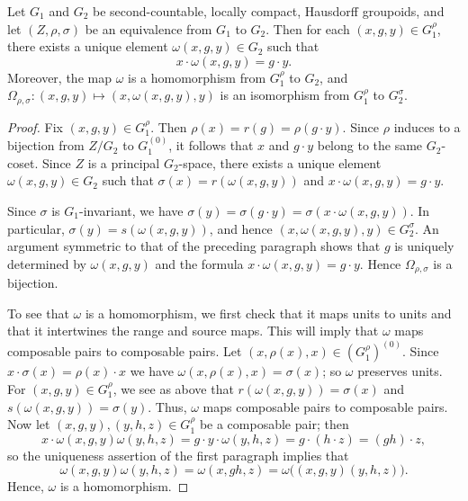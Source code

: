 \documentclass[12pt,a4paper]{amsart}
\newcommand{\id}{\operatorname{id}}
\newcommand{\unit}[1]{#1}%
\begin{document}
\begin{lemma}\label{lem:pullback groupoids equiv}
Let $G_1$ and $G_2$ be second-countable, locally compact,
Hausdorff groupoids, and let $(Z,\rho,\sigma)$ be an
equivalence from $G_1$ to $G_2$. Then for each $(x,g,y) \in
G_1^\rho$, there exists a unique element $\omega(x,g,y) \in
G_2$ such that
\begin{equation*}\label{eq:theta def}
x \cdot \omega(x,g,y) = g \cdot y.
\end{equation*}
Moreover, the map $\omega$ is a homomorphism from $G_1^\rho$ to
$G_2$, and $\Omega_{\rho,\sigma} : (x,g,y) \mapsto (x,
\omega(x,g,y), y)$ is an isomorphism from $G_1^\rho$ to
$G_2^\sigma$.
\end{lemma}
\begin{proof}
Fix $(x,g,y) \in G_1^\rho$. Then $\rho(x) = r(g) = \rho(g\cdot
y)$. Since $\rho$ induces to a bijection from $Z/G_2$ to
$G_1^{(0)}$, it follows that $x$ and $g\cdot y$ belong to the
same $G_2$-coset. Since $Z$ is a principal $G_2$-space, there
exists a unique element $\omega(x,g,y) \in G_2$ such that
$\sigma(x) = r(\omega(x,g,y))$ and $x \cdot \omega(x,g,y) = g
\cdot y$.

Since $\sigma$ is $G_1$-invariant, we have $\sigma(y) =
\sigma(g \cdot y) = \sigma(x \cdot \omega(x,g,y))$. In
particular, $\sigma(y) = s(\omega(x,g,y))$, and hence $(x,
\omega(x,g,y), y) \in G_2^\sigma$. An argument symmetric to
that of the preceding paragraph shows that $g$ is uniquely
determined by $\omega(x,g,y)$ and the formula $x \cdot
\omega(x,g,y) = g \cdot y$. Hence $\Omega_{\rho,\sigma}$ is a
bijection.

To see that $\omega$ is a homomorphism, we first check that it
maps units to units and that it intertwines the range and source
maps. This will imply that $\omega$ maps composable pairs to
composable pairs.  Let $(x, \rho(x), x) \in (G_1^\rho)^{(0)}$.
Since $x \cdot \sigma(x) = \rho(x) \cdot x$ we have $\omega(x,
\rho(x), x)  = \sigma(x)$; so $\omega$ preserves units. For
$(x,g,y) \in G_1^\rho$, we see as above that $r(\omega(x,g,y)) =
\sigma(x)$ and $s(\omega(x,g,y)) = \sigma(y)$. Thus, $\omega$
maps composable pairs to composable pairs.  Now let  $(x,g,y),
(y,h,z) \in G_1^\rho$ be a composable pair; then
\[
x \cdot \omega(x,g,y)\omega(y,h,z) = g \cdot y \cdot \omega(y,h,z) = g\cdot(h \cdot z) = (gh)\cdot z,
\]
so the uniqueness assertion of the first paragraph implies that
\begin{equation*}\label{eq:mpctn of omegas}
\omega(x,g,y)\omega(y,h,z) = \omega(x,gh,z) = \omega\big((x,g,y)(y,h,z)\big).
\end{equation*}
Hence,  $\omega$ is a homomorphism.


\end{proof}
\end{document}
